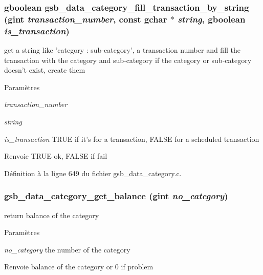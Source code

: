 \subsubsection[{gsb\_\-data\_\-category\_\-fill\_\-transaction\_\-by\_\-string}]{\setlength{\rightskip}{0pt plus 5cm}gboolean gsb\_\-data\_\-category\_\-fill\_\-transaction\_\-by\_\-string (gint {\em transaction\_\-number}, \/  const gchar $\ast$ {\em string}, \/  gboolean {\em is\_\-transaction})}\label{gsb__data__category_8c_ab038a913b9c16fabc45e33f60ea97649}
get a string like 'category : sub-\/category', a transaction number and fill the transaction with the category and sub-\/category if the category or sub-\/category doesn't exist, create them


\begin{DoxyParams}{Paramètres}
\item[{\em transaction\_\-number}]\item[{\em string}]\item[{\em is\_\-transaction}]TRUE if it's for a transaction, FALSE for a scheduled transaction\end{DoxyParams}
\begin{DoxyReturn}{Renvoie}
TRUE ok, FALSE if fail 
\end{DoxyReturn}


Définition à la ligne 649 du fichier gsb\_\-data\_\-category.c.

\subsubsection[{gsb\_\-data\_\-category\_\-get\_\-balance}]{ gsb\_\-data\_\-category\_\-get\_\-balance (gint {\em no\_\-category})}\label{gsb__data__category_8c_a102bf405f0b935f393efafaf1cf53503}
return balance of the category


\begin{DoxyParams}{Paramètres}
\item[{\em no\_\-category}]the number of the category\end{DoxyParams}
\begin{DoxyReturn}{Renvoie}
balance of the category or 0 if problem 
\end{DoxyReturn}


